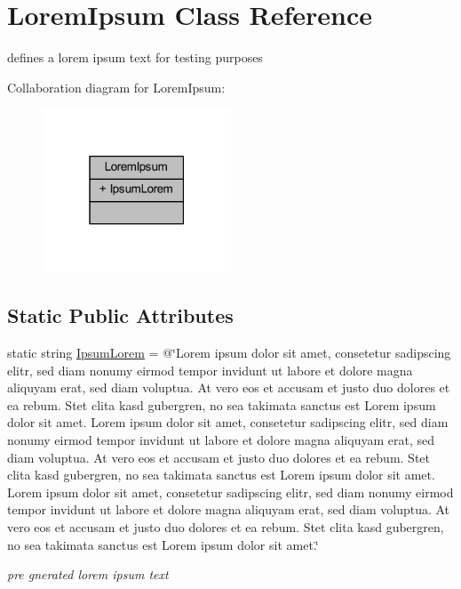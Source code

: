 \hypertarget{class_lorem_ipsum}{}\section{Lorem\+Ipsum Class Reference}
\label{class_lorem_ipsum}


defines a lorem ipsum text for testing purposes  




Collaboration diagram for Lorem\+Ipsum\+:
\nopagebreak
\begin{figure}[H]
\begin{center}
\leavevmode
\includegraphics[width=159pt]{class_lorem_ipsum__coll__graph}
\end{center}
\end{figure}
\subsection*{Static Public Attributes}
\begin{DoxyCompactItemize}
\item 
static string \mbox{\hyperlink{class_lorem_ipsum_a1a11ef50e3a5b94928207b15b4ce6fa6}{Ipsum\+Lorem}} = @\char`\"{}Lorem ipsum dolor sit amet, consetetur sadipscing elitr, sed diam nonumy eirmod tempor invidunt ut labore et dolore magna aliquyam erat, sed diam voluptua. At vero eos et accusam et justo duo dolores et ea rebum. Stet clita kasd gubergren, no sea takimata sanctus est Lorem ipsum dolor sit amet. Lorem ipsum dolor sit amet, consetetur sadipscing elitr, sed diam nonumy eirmod tempor invidunt ut labore et dolore magna aliquyam erat, sed diam voluptua. At vero eos et accusam et justo duo dolores et ea rebum. Stet clita kasd gubergren, no sea takimata sanctus est Lorem ipsum dolor sit amet. Lorem ipsum dolor sit amet, consetetur sadipscing elitr, sed diam nonumy eirmod tempor invidunt ut labore et dolore magna aliquyam erat, sed diam voluptua. At vero eos et accusam et justo duo dolores et ea rebum. Stet clita kasd gubergren, no sea takimata sanctus est Lorem ipsum dolor sit amet.\char`\"{}
\begin{DoxyCompactList}\small\item\em pre gnerated lorem ipsum text \end{DoxyCompactList}\end{DoxyCompactItemize}


